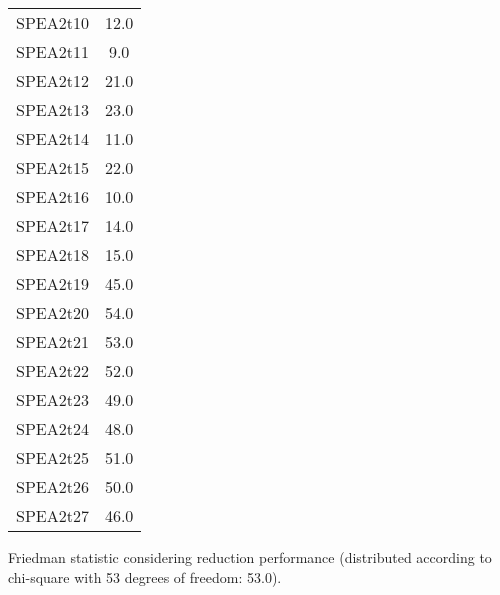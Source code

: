 \documentclass{article}
\begin{document}
\begin{table}[!htp]
\begin{tabular}{c|c}
SPEA2t10&12.0\\
SPEA2t11&9.0\\
SPEA2t12&21.0\\
SPEA2t13&23.0\\
SPEA2t14&11.0\\
SPEA2t15&22.0\\
SPEA2t16&10.0\\
SPEA2t17&14.0\\
SPEA2t18&15.0\\
SPEA2t19&45.0\\
SPEA2t20&54.0\\
SPEA2t21&53.0\\
SPEA2t22&52.0\\
SPEA2t23&49.0\\
SPEA2t24&48.0\\
SPEA2t25&51.0\\
SPEA2t26&50.0\\
SPEA2t27&46.0\\
\end{tabular}
\end{table}


Friedman statistic considering reduction performance (distributed according to chi-square with 53 degrees of freedom: 53.0).
\end{document}
